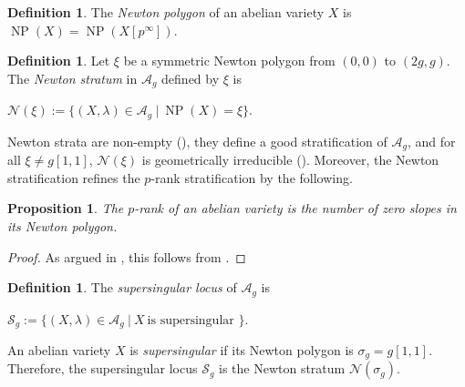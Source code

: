 \documentclass[11pt,table]{amsart}
\DeclareMathOperator{\NP}{NP}
\numberwithin{equation}{section}
\newtheorem{prop}[thm]{Proposition}
\theoremstyle{definition}
\newtheorem{defn}[thm]{Definition}
\theoremstyle{remark}
\theoremstyle{remark}
\begin{document}
\begin{defn}
  The \textit{Newton polygon} of an abelian variety $X$ is $\NP(X) = \NP (X[p^{\infty}])$.
\end{defn}
\begin{defn}
Let $\xi$ be a symmetric Newton polygon from $(0,0)$ to $(2g,g)$. The \textit{Newton stratum} in $\mathcal{A}_{g}$ defined by $\xi$ is 
\begin{center}
    $\mathcal{N}(\xi) := \{ (X, \lambda) \in \mathcal{A}_{g} \ \vert \ \NP(X) = \xi \}$.
\end{center}
\end{defn}
Newton strata are non-empty (\cite[Page 98]{MR3077121}), they define a good stratification of $\mathcal{A}_{g}$, and for all $\xi \ne g[1,1]$, $\mathcal{N}(\xi) $ is geometrically irreducible (\cite[Theorem 3.1]{chai2011monodromy}). Moreover, the Newton stratification refines the $p$-rank stratification by the following. 
\begin{prop}\label{pranksofnewtonpolygons}
The $p$-rank of an abelian variety is the number of zero slopes in its Newton polygon.    
\end{prop}
\begin{proof}
 As argued in \cite[Page 14, Remark 2.29]{karemaker2024geometry}, this follows from \cite[Remark 3.3]{oort1991moduli}.
\end{proof}
\begin{defn}
    The \textit{supersingular locus} of $\mathcal{A}_g$ is 
\begin{center}
    $\mathcal{S}_{g} := \{ (X, \lambda) \in \mathcal{A}_{g} \ \vert \ X  \ \text{is supersingular } \}.$
\end{center}
\end{defn}
An abelian variety $X$ is \textit{supersingular} if its Newton polygon is $\sigma_{g} = g[1,1]$. Therefore, the supersingular locus $\mathcal{S}_g$ is the Newton stratum $\mathcal{N}(\sigma_g)$. 
\end{document}
